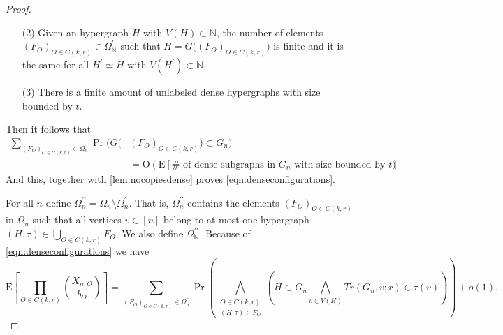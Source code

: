 \documentclass[12pt,notitlepage,a4paper]{article}
\theoremstyle{definition}
\newcommand{\N}{\mathbb{N}}
\begin{document}
\begin{proof}
\begin{itemize}
		\item[(2)] Given an hypergraph $H$ with $V(H)\subset \N$,
		the number of elements  $(F_O)_{O\in C(k,r)}\in \Omega_\N^\prime$
		such that $H=G\big((F_O)_{O\in C(k,r)}\big)$ is finite and it is 
		the same for all $H^\prime \simeq H$ with $V(H^\prime) \subset \N$.
		
		\item[(3)] There is a finite amount of unlabeled dense
		hypergraphs with size bounded by $t$.
	\end{itemize}
	Then it follows that
	\begin{align*}
	\sum_{(F_O)_{O\in C(k,r)}\in \Omega^\prime_n}
	\Pr \Big(
	G\Big(&(F_O)_{O\in C(k,r)}\Big) \subset G_n
	 \Big) \\
	& = 
	\mathrm{O} \left(
	\mathrm{E}\left[
	\# \text{ of dense subgraphs in $G_n$ with size bounded by
	 $t$}\right] \right).	
	\end{align*}
	And this, together with \cref{lem:nocopiesdense} proves
	\cref{eqn:denseconfigurations}.\par
	For all $n$ define $\Omega_n^{\prime\prime}=
	\Omega_n\setminus \Omega_n^\prime$. That is, 
	$\Omega_n^{\prime\prime}$ contains the elements
	$(F_O)_{O\in C(k,r)}$ in $\Omega_n$ such that all vertices
	$v\in [n]$ belong to at most one hypergraph
	$(H,\tau)\in \bigcup_{O\in C(k,r)} F_O$. We also
	define $\Omega_\N^{\prime\prime}$. Because of 
	\cref{eqn:denseconfigurations} we have
	\[
	\mathrm{E}\left[
	\prod_{O\in C(k,r)}
	\binom{X_{n,O}}{b_O}
	\right]=
	\sum_{(F_O)_{O\in C(k,r)}\in \Omega_n^{\prime\prime}}
	\Pr\left(
	\bigwedge_{
	\substack{
		O\in C(k,r)\\
		(H,\tau)\in F_O
	}}
	\left(
	H\subset G_n
	\bigwedge_{v\in V(H)}
	Tr(G_n,v;r)\in \tau(v)
	\right)
	\right)+o(1).
	\]
	

\end{proof}
\end{document}
